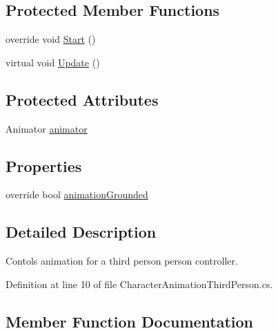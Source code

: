 \subsection*{Protected Member Functions}
\begin{DoxyCompactItemize}
\item 
override void \mbox{\hyperlink{class_root_motion_1_1_demos_1_1_character_animation_third_person_a1cdf638262be99e19f767b42aa2a9a9a}{Start}} ()
\item 
virtual void \mbox{\hyperlink{class_root_motion_1_1_demos_1_1_character_animation_third_person_a8b82eaa4dd58a3f25722713ba6092789}{Update}} ()
\end{DoxyCompactItemize}
\subsection*{Protected Attributes}
\begin{DoxyCompactItemize}
\item 
Animator \mbox{\hyperlink{class_root_motion_1_1_demos_1_1_character_animation_third_person_a451ae3f99ce38ba03e5ed37a865e7125}{animator}}
\end{DoxyCompactItemize}
\subsection*{Properties}
\begin{DoxyCompactItemize}
\item 
override bool \mbox{\hyperlink{class_root_motion_1_1_demos_1_1_character_animation_third_person_a8edcce70454732442f54ae22ffb42f64}{animation\+Grounded}}
\end{DoxyCompactItemize}


\subsection{Detailed Description}
Contols animation for a third person person controller. 



Definition at line 10 of file Character\+Animation\+Third\+Person.\+cs.



\subsection{Member Function Documentation}
\mbox{\label{class_root_motion_1_1_demos_1_1_character_animation_third_person_afb93b73712ca23aafeb4f50f38d68069}} 
